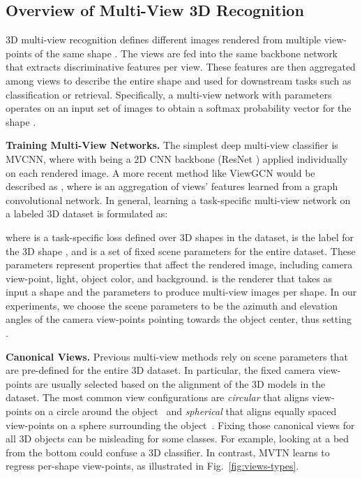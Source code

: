 \documentclass[10pt,twocolumn,letterpaper]{article}
\newcommand{\figLabel}{Fig.~}
\newcommand{\mysection}[1]{\noindent\textbf{#1.}}
\begin{document}
\subsection{Overview of Multi-View 3D Recognition}
\vspace{-4pt}
3D multi-view recognition defines  different images  rendered from multiple view-points of the same shape . The views are fed into the same backbone network  that extracts discriminative features per view. These features are then aggregated among views to describe the entire shape and used for downstream tasks such as classification or retrieval. 
Specifically, a multi-view network  with parameters 
operates on an input set of images  to obtain a softmax probability vector for the shape .

\mysection{Training Multi-View Networks}
The simplest deep multi-view classifier is MVCNN, where  with  being a 2D CNN backbone (\eg ResNet \cite{resnet}) applied individually on each rendered image. A more recent method like ViewGCN would be described as , where  is an aggregation of views' features learned from a graph convolutional network. In general, learning a task-specific multi-view network on a labeled 3D dataset is formulated as:

\noindent where  is a task-specific loss defined over  3D shapes in the dataset,
 is the label for the  3D shape , and  is a set of  fixed scene parameters for the entire dataset. These parameters represent properties that affect the rendered image, including camera view-point, light, object color, and background.  is the renderer that takes as input a shape  and the parameters  to produce  multi-view images  per shape. 
In our experiments, we choose the scene parameters  to be the azimuth and elevation angles of the camera view-points pointing towards the object center, thus setting .


\mysection{Canonical Views}
Previous multi-view methods rely on scene parameters  that are pre-defined for the entire 3D dataset. In particular, the fixed camera view-points are usually selected based on the alignment of the 3D models in the dataset. The most common view configurations are \textit{circular} that aligns view-points on a circle around the object~\cite{mvcnn,mvnhbn} and \textit{spherical} that aligns equally spaced view-points on a sphere surrounding the object~\cite{mvviewgcn,mvrotationnet}. 
Fixing those canonical views for all 3D objects can be misleading for some classes. For example, looking at a bed from the bottom could confuse a 3D classifier.
In contrast, MVTN learns to regress per-shape view-points, as illustrated in \figLabel{\ref{fig:views-types}}.
\end{document}
